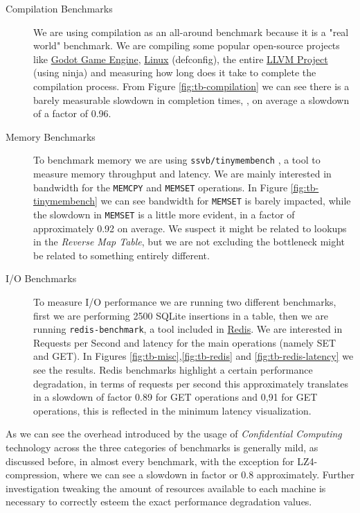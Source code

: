 \documentclass[twocolumn]{article}
\begin{document}
\begin{description}
    \item[Compilation Benchmarks] We are using compilation as an all-around benchmark because it is a "real world" benchmark. We are compiling some popular open-source projects like \href{https://github.com/godotengine/godot}{Godot Game Engine}, \href{https://git.kernel.org/pub/scm/linux/kernel/git/torvalds/linux.git}{Linux} (defconfig), the entire \href{https://github.com/llvm/llvm-project}{LLVM Project} (using ninja) and measuring how long does it take to complete the compilation process. From Figure \ref{fig:tb-compilation} we can see there is a barely measurable slowdown in completion times, ,  on average a slowdown of a factor of 0.96.
    \item[Memory Benchmarks] To benchmark memory we are using \texttt{ssvb/tinymembench} \cite{tinymembench}, a tool to measure memory throughput and latency. We are mainly interested in bandwidth for the \texttt{MEMCPY} and \texttt{MEMSET} operations. In Figure \ref{fig:tb-tinymembench} we can see bandwidth for \texttt{MEMSET} is barely impacted, while the slowdown in \texttt{MEMSET} is a little more evident, in a factor of approximately 0.92 on average. We suspect it might be related to lookups in the \textit{Reverse Map Table}, but we are not excluding the bottleneck might be related to something entirely different.
    \item[I/O Benchmarks] To measure I/O performance we are running two different benchmarks, first we are performing 2500 SQLite insertions in a table, then we are running \texttt{redis-benchmark}, a tool included in \href{https://redis.io/}{Redis}. We are interested in Requests per Second and latency for the main operations (namely SET and GET). In Figures \ref{fig:tb-misc},\ref{fig:tb-redis} and \ref{fig:tb-redis-latency} we see the results. Redis benchmarks highlight a certain performance degradation, in terms of requests per second this approximately translates in a slowdown of factor 0.89 for GET operations and 0,91 for GET operations, this is reflected in the minimum latency visualization. 
\end{description}

As we can see the overhead introduced by the usage of \textit{Confidential Computing} technology across the three categories of benchmarks is generally mild, as discussed before, in almost every benchmark, with the exception for LZ4-compression, where we can see a slowdown in factor or 0.8 approximately. Further investigation tweaking the amount of resources available to each machine is necessary to correctly esteem the exact performance degradation values.
\end{document}
